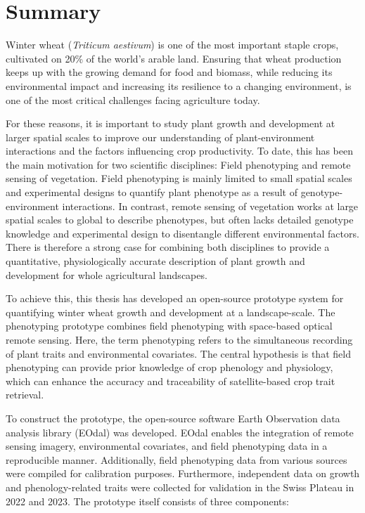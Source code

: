 \chapter*{Summary}

Winter wheat (\textsl{Triticum aestivum}) is one of the most important staple crops, cultivated on 20\% of the world's arable land. Ensuring that wheat production keeps up with the growing demand for food and biomass, while reducing its environmental impact and increasing its resilience to a changing environment, is one of the most critical challenges facing agriculture today.

For these reasons, it is important to study plant growth and development at larger spatial scales to improve our understanding of plant-environment interactions and the factors influencing crop productivity. To date, this has been the main motivation for two scientific disciplines: Field phenotyping and remote sensing of vegetation. Field phenotyping is mainly limited to small spatial scales and experimental designs to quantify plant phenotype as a result of genotype-environment interactions. In contrast, remote sensing of vegetation works at large spatial scales to global to describe phenotypes, but often lacks detailed genotype knowledge and experimental design to disentangle different environmental factors. There is therefore a strong case for combining both disciplines to provide a quantitative, physiologically accurate description of plant growth and development for whole agricultural landscapes.

To achieve this, this thesis has developed an open-source prototype system for quantifying winter wheat growth and development at a landscape-scale. The phenotyping prototype combines field phenotyping with space-based optical remote sensing. Here, the term phenotyping refers to the simultaneous recording of plant traits and environmental covariates. The central hypothesis is that field phenotyping can provide prior knowledge of crop phenology and physiology, which can enhance the accuracy and traceability of satellite-based crop trait retrieval.

To construct the prototype, the open-source software Earth Observation data analysis library (EOdal) was developed. EOdal enables the integration of remote sensing imagery, environmental covariates, and field phenotyping data in a reproducible manner. Additionally, field phenotyping data from various sources were compiled for calibration purposes. Furthermore, independent data on growth and phenology-related traits were collected for validation in the Swiss Plateau in 2022 and 2023. The prototype itself consists of three components:


